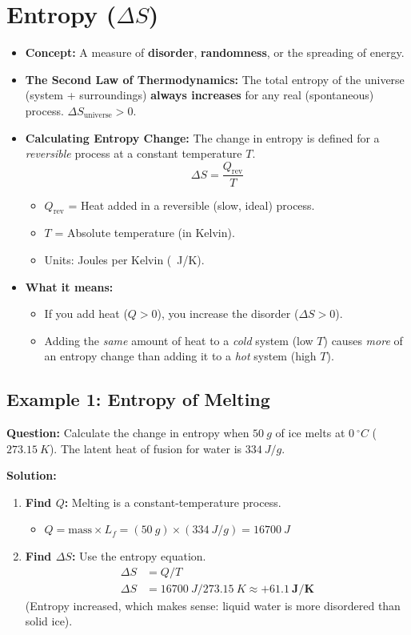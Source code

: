 \documentclass[article]{article}
\begin{document}
\section{Entropy ($\Delta S$)}
\begin{itemize}
    \item \textbf{Concept:} A measure of \textbf{disorder}, \textbf{randomness}, or the spreading of energy.
    \item \textbf{The Second Law of Thermodynamics:} The total entropy of the universe (system + surroundings) \textbf{always increases} for any real (spontaneous) process. $\Delta S_{\text{universe}} > 0$.
    \item \textbf{Calculating Entropy Change:} The change in entropy is defined for a \textit{reversible} process at a constant temperature $T$.
        $$ \Delta S = \frac{Q_{\text{rev}}}{T} $$
    \begin{itemize}
        \item $Q_{\text{rev}}$ = Heat added in a reversible (slow, ideal) process.
        \item $T$ = Absolute temperature (in Kelvin).
        \item Units: Joules per Kelvin (\SI{}{J/K}).
    \end{itemize}
    \item \textbf{What it means:}
    \begin{itemize}
        \item If you add heat ($Q > 0$), you increase the disorder ($\Delta S > 0$).
        \item Adding the \textit{same} amount of heat to a \textit{cold} system (low $T$) causes \textit{more} of an entropy change than adding it to a \textit{hot} system (high $T$).
    \end{itemize}
\end{itemize}

\subsection{Example 1: Entropy of Melting}
\textbf{Question:} Calculate the change in entropy when $\SI{50}{g}$ of ice melts at $\SI{0}{^\circ C}$ ($\SI{273.15}{K}$). The latent heat of fusion for water is $\SI{334}{J/g}$.

\textbf{Solution:}
\begin{enumerate}
    \item \textbf{Find $Q$:} Melting is a constant-temperature process.
    \begin{itemize}
        \item $Q = \text{mass} \times L_f = (\SI{50}{g}) \times (\SI{334}{J/g}) = \SI{16700}{J}$
    \end{itemize}
    \item \textbf{Find $\Delta S$:} Use the entropy equation.
    \begin{align*}
        \Delta S &= Q / T \\
        \Delta S &= \SI{16700}{J} / \SI{273.15}{K} \approx \mathbf{+\SI{61.1}{J/K}}
    \end{align*}
    (Entropy increased, which makes sense: liquid water is more disordered than solid ice).
\end{enumerate}
\end{document}
